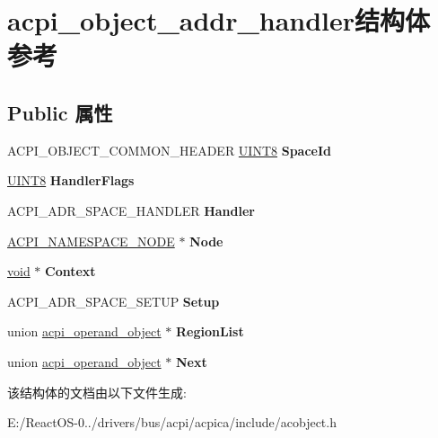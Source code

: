 \hypertarget{structacpi__object__addr__handler}{}\section{acpi\+\_\+object\+\_\+addr\+\_\+handler结构体 参考}
\label{structacpi__object__addr__handler}
\subsection*{Public 属性}
\begin{DoxyCompactItemize}
\item 
\mbox{\label{structacpi__object__addr__handler_a3205224af2a0f9c7403ddc5489d8b0eb}} 
A\+C\+P\+I\+\_\+\+O\+B\+J\+E\+C\+T\+\_\+\+C\+O\+M\+M\+O\+N\+\_\+\+H\+E\+A\+D\+ER \hyperlink{_processor_bind_8h_ab27e9918b538ce9d8ca692479b375b6a}{U\+I\+N\+T8} {\bfseries Space\+Id}
\item 
\mbox{\label{structacpi__object__addr__handler_aad8ceb44777a55d7b78435690f88d9bc}} 
\hyperlink{_processor_bind_8h_ab27e9918b538ce9d8ca692479b375b6a}{U\+I\+N\+T8} {\bfseries Handler\+Flags}
\item 
\mbox{\label{structacpi__object__addr__handler_a6f3ae9a8115d7ffc2bd9dff7551bf780}} 
A\+C\+P\+I\+\_\+\+A\+D\+R\+\_\+\+S\+P\+A\+C\+E\+\_\+\+H\+A\+N\+D\+L\+ER {\bfseries Handler}
\item 
\mbox{\label{structacpi__object__addr__handler_a337767a20b2327e119352dce89fbd87f}} 
\hyperlink{structacpi__namespace__node}{A\+C\+P\+I\+\_\+\+N\+A\+M\+E\+S\+P\+A\+C\+E\+\_\+\+N\+O\+DE} $\ast$ {\bfseries Node}
\item 
\mbox{\label{structacpi__object__addr__handler_a05b40e412d7bd6bfbe913adbc1c12eab}} 
\hyperlink{interfacevoid}{void} $\ast$ {\bfseries Context}
\item 
\mbox{\label{structacpi__object__addr__handler_ac4db7c84d9cd3561707fed2b1f97f935}} 
A\+C\+P\+I\+\_\+\+A\+D\+R\+\_\+\+S\+P\+A\+C\+E\+\_\+\+S\+E\+T\+UP {\bfseries Setup}
\item 
\mbox{\label{structacpi__object__addr__handler_a074ec5653fc8a47e86d833bcfdfb1c8e}} 
union \hyperlink{unionacpi__operand__object}{acpi\+\_\+operand\+\_\+object} $\ast$ {\bfseries Region\+List}
\item 
\mbox{\label{structacpi__object__addr__handler_aeeb3eb0628a1fbb73ac73defcbaef142}} 
union \hyperlink{unionacpi__operand__object}{acpi\+\_\+operand\+\_\+object} $\ast$ {\bfseries Next}
\end{DoxyCompactItemize}


该结构体的文档由以下文件生成\+:\begin{DoxyCompactItemize}
\item 
E\+:/\+React\+O\+S-\/0../drivers/bus/acpi/acpica/include/acobject.\+h\end{DoxyCompactItemize}
